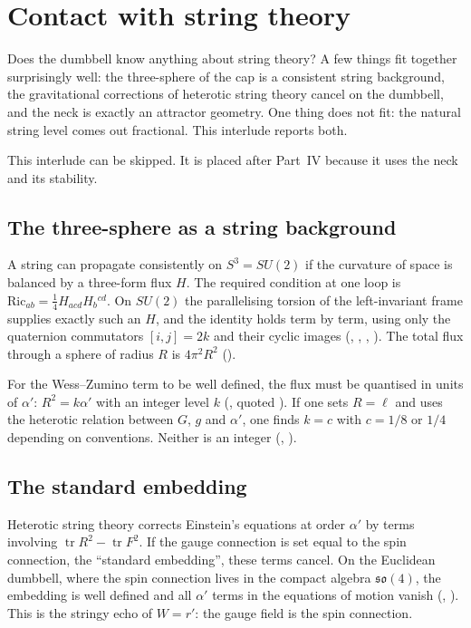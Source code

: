 \chapter{Contact with string theory}\label{int:B}

\begin{questionbox}
Does the dumbbell know anything about string theory? A few things fit together surprisingly well: the three-sphere of the cap is a consistent string background, the gravitational corrections of heterotic string theory cancel on the dumbbell, and the neck is exactly an attractor geometry. One thing does not fit: the natural string level comes out fractional. This interlude reports both.
\end{questionbox}

This interlude can be skipped. It is placed after Part~IV because it uses the neck and its stability.

\section{The three-sphere as a string background}

A string can propagate consistently on $S^3=SU(2)$ if the curvature of space is balanced by a three-form flux $H$. The required condition at one loop is $\mathrm{Ric}_{ab}=\tfrac14H_{acd}H_b{}^{cd}$. On $SU(2)$ the parallelising torsion of the left-invariant frame supplies exactly such an $H$, and the identity holds term by term, using only the quaternion commutators $[i,j]=2k$ and their cyclic images (, , , ). The total flux through a sphere of radius $R$ is $4\pi^2R^2$ ().

For the Wess--Zumino term to be well defined, the flux must be quantised in units of $\alpha'$: $R^2=k\alpha'$ with an integer level $k$ (, quoted \external). If one sets $R=\ell$ and uses the heterotic relation between $G$, $g$ and $\alpha'$, one finds $k=c$ with $c=1/8$ or $1/4$ depending on conventions. Neither is an integer (, ). \negative

\section{The standard embedding}

Heterotic string theory corrects Einstein's equations at order $\alpha'$ by terms involving $\operatorname{tr}R^2-\operatorname{tr}F^2$. If the gauge connection is set equal to the spin connection, the ``standard embedding'', these terms cancel. On the Euclidean dumbbell, where the spin connection lives in the compact algebra $\mathfrak{so}(4)$, the embedding is well defined and all $\alpha'$ terms in the equations of motion vanish (, ). This is the stringy echo of $W=r'$: the gauge field is the spin connection.

